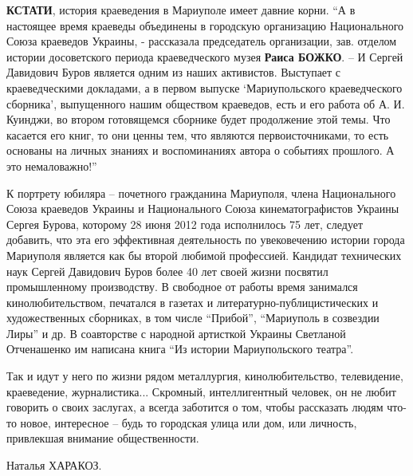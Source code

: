 \textbf{КСТАТИ}, история краеведения в Мариуполе имеет давние корни. \enquote{А в настоящее
время краеведы объединены в городскую организацию  Национального Союза
краеведов Украины, - рассказала председатель организации, зав. отделом истории
досоветского периода краеведческого музея \textbf{Раиса БОЖКО}. – И Сергей Давидович
Буров является одним из наших активистов. Выступает с краеведческими докладами,
а в первом выпуске \enquote{Мариупольского краеведческого сборника}, выпущенного нашим
обществом краеведов, есть и его работа об А. И. Куинджи, во втором готовящемся
сборнике будет продолжение этой темы. Что касается его книг, то они ценны тем,
что являются первоисточниками, то есть основаны на личных знаниях и
воспоминаниях автора о событиях прошлого. А это немаловажно!}

К портрету юбиляра – почетного гражданина Мариуполя, члена Национального Союза
краеведов Украины и Национального Союза кинематографистов Украины Сергея
Бурова, которому 28 июня 2012 года исполнилось 75 лет, следует добавить, что
эта его эффективная деятельность по увековечению истории города Мариуполя
является как бы второй любимой профессией. Кандидат технических наук Сергей
Давидович Буров более 40 лет своей жизни посвятил промышленному производству. В
свободное от работы время занимался кинолюбительством, печатался в газетах и
литературно-публицистических и художественных сборниках, в том числе \enquote{Прибой},
\enquote{Мариуполь в созвездии Лиры} и др. В соавторстве с народной артисткой Украины
Светланой Отченашенко им написана книга \enquote{Из истории Мариупольского театра}.

Так и идут у него по жизни рядом металлургия, кинолюбительство, телевидение,
краеведение, журналистика... Скромный, интеллигентный человек, он не любит
говорить о своих заслугах, а всегда заботится о том, чтобы рассказать людям
что-то новое, интересное – будь то городская улица или дом, или личность,
привлекшая внимание общественности.

Наталья ХАРАКОЗ.
